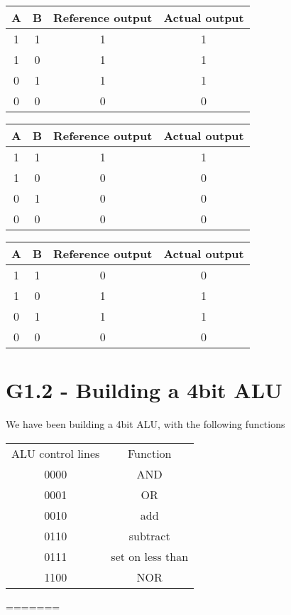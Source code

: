 \documentclass[11pt,a4paper]{article}
\begin{document}
\begin{table}
    \begin{tabular}{c | c || c || c}
        A & B & Reference output & Actual output \\ \hline
        1 & 1 & 1                & 1        \\
        1 & 0 & 1                & 1        \\
        0 & 1 & 1                & 1        \\
        0 & 0 & 0                & 0        \\
    \end{tabular}
\end{table}

\begin{table}
    \begin{tabular}{c | c || c || c}
        A & B & Reference output & Actual output \\ \hline
        1 & 1 & 1                & 1        \\
        1 & 0 & 0                & 0        \\
        0 & 1 & 0                & 0        \\
        0 & 0 & 0                & 0        \\
    \end{tabular}
\end{table}

\begin{table}
    \begin{tabular}{c | c || c || c}
        A & B & Reference output & Actual output \\ \hline
        1 & 1 & 0                & 0        \\
        1 & 0 & 1                & 1        \\
        0 & 1 & 1                & 1        \\
        0 & 0 & 0                & 0        \\
    \end{tabular}
\end{table}

\section*{G1.2 - Building a 4bit ALU}
We have been building a 4bit ALU, with the following functions

\begin{tabular}{ c c }
    ALU control lines & Function \\ 
    0000 & AND \\
    0001 & OR \\
    0010 & add \\
    0110 & subtract \\
    0111 & set on less than \\
    1100 & NOR \\

\end{tabular}
=======
\end{document}
